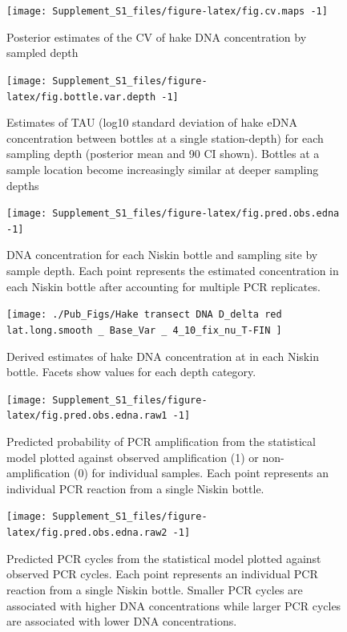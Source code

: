 \documentclass[
]{article}
\begin{document}
\begin{figure}
\texttt{[image: Supplement\_S1\_files/figure-latex/fig.cv.maps -1]} \caption{\label{fig:cv.maps} Posterior estimates of the CV of hake DNA concentration by sampled depth}\label{fig:fig.cv.maps }
\end{figure}

\begin{figure}
\texttt{[image: Supplement\_S1\_files/figure-latex/fig.bottle.var.depth -1]} \caption{\label{fig:bottle.var.depth} Estimates of TAU (log10 standard deviation of hake eDNA concentration between bottles at a single station-depth) for each sampling depth (posterior mean and 90 CI shown). Bottles at a sample location become increasingly similar at deeper sampling depths }\label{fig:fig.bottle.var.depth }
\end{figure}

\begin{figure}
\texttt{[image: Supplement\_S1\_files/figure-latex/fig.pred.obs.edna -1]} \caption{\label{fig:pred.obs.edna} DNA concentration for each Niskin bottle and sampling site by sample depth. Each point represents the estimated concentration in each Niskin bottle after accounting for multiple PCR replicates.}\label{fig:fig.pred.obs.edna }
\end{figure}

\begin{figure}
\texttt{[image: ./Pub\_Figs/Hake transect DNA D\_delta red lat.long.smooth \_ Base\_Var \_ 4\_10\_fix\_nu\_T-FIN ]} \caption{\label{fig:red.delta} Derived estimates of hake DNA concentration at in each Niskin bottle.  Facets show values for each depth category. }\label{fig:fig.red.delta }
\end{figure}

\begin{figure}
\texttt{[image: Supplement\_S1\_files/figure-latex/fig.pred.obs.edna.raw1 -1]} \caption{\label{fig:pred.obs.edna.raw1} Predicted probability of PCR amplification from the statistical model plotted against observed amplification (1) or non-amplification (0) for individual samples. Each point represents an individual PCR reaction from a single Niskin bottle.}\label{fig:fig.pred.obs.edna.raw1 }
\end{figure}

\begin{figure}
\texttt{[image: Supplement\_S1\_files/figure-latex/fig.pred.obs.edna.raw2 -1]} \caption{\label{fig:pred.obs.edna.raw2} Predicted PCR cycles from the statistical model plotted against observed PCR cycles. Each point represents an individual PCR reaction from a single Niskin bottle. Smaller PCR cycles are associated with higher DNA concentrations while larger PCR cycles are associated with lower DNA concentrations.}\label{fig:fig.pred.obs.edna.raw2 }
\end{figure}
\end{document}
